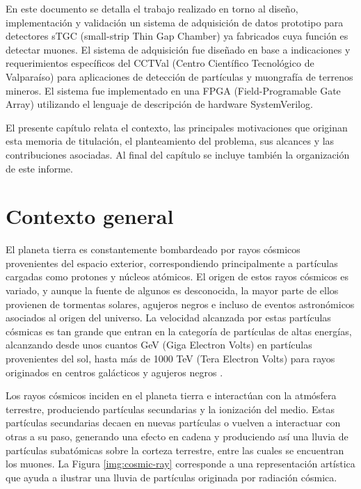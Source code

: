 En este documento se detalla el trabajo realizado en torno al diseño, implementación y validación un sistema de adquisición de datos prototipo para detectores sTGC (small-strip Thin Gap Chamber) ya fabricados cuya función es detectar muones. El sistema de adquisición fue diseñado en base a indicaciones y requerimientos específicos del CCTVal (Centro Científico Tecnológico de Valparaíso) para aplicaciones de detección de partículas y muongrafía de terrenos mineros. El sistema fue implementado en una FPGA (Field-Programable Gate Array) utilizando el lenguaje de descripción de hardware SystemVerilog.

El presente capítulo relata el contexto, las principales motivaciones que originan esta memoria de titulación, el planteamiento del problema, sus alcances y las contribuciones asociadas. Al final del capítulo se incluye también la organización de este informe.

\section{Contexto general}

	El planeta tierra es constantemente bombardeado por rayos cósmicos provenientes del espacio exterior, correspondiendo principalmente a partículas cargadas como protones y núcleos atómicos. El origen de estos rayos cósmicos es variado, y aunque la fuente de algunos es desconocida, la mayor parte de ellos provienen de tormentas solares, agujeros negros e incluso de eventos astronómicos asociados al origen del universo\cite{Tanabashi2018ReviewPhysics}. La velocidad alcanzada por estas partículas cósmicas es tan grande que entran en la categoría de partículas de altas energías, alcanzando desde unos cuantos GeV (Giga Electron Volts) en partículas provenientes del sol, hasta más de 1000 TeV (Tera Electron Volts) para rayos originados en centros galácticos y agujeros negros \cite{DeUndergraduatePhysics}.
	
	Los rayos cósmicos inciden en el planeta tierra e interactúan con la atmósfera terrestre, produciendo partículas secundarias y la ionización del medio. Estas partículas secundarias decaen en nuevas partículas o vuelven a interactuar con otras a su paso, generando una efecto en cadena y produciendo así una lluvia de partículas subatómicas sobre la corteza terrestre, entre las cuales se encuentran los muones. La Figura \ref{img:cosmic-ray} corresponde a una representación artística que ayuda a ilustrar una lluvia de partículas originada por radiación cósmica.
	
